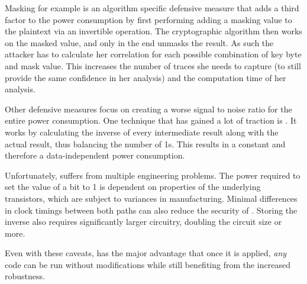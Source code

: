 Masking\cite{golic2002multiplicative}\cite{coron2000boolean} for example is an algorithm specific defensive measure that adds a third factor to the power consumption by first performing adding a masking value to the plaintext via an invertible operation.
The cryptographic algorithm then works on the masked value, and only in the end unmasks the result.
As such the attacker has to calculate her correlation for each possible combination of key byte and mask value.
This increases the number of traces she needs to capture (to still provide the same confidence in her analysis) and the computation time of her analysis.

Other defensive measures focus on creating a worse signal to noise ratio for the entire power consumption.
One technique that has gained a lot of traction is \dual{}\cite{sokolov2005design}.
It works by calculating the inverse of every intermediate result along with the actual result, thus balancing the number of 1s.
This results in a constant \hammingw{} and therefore a data-independent power consumption.

Unfortunately, \dual{} suffers from multiple engineering problems.
The power required to set the value of a bit to 1 is dependent on properties of the underlying transistors, which are subject to variances in manufacturing.\cite{razafindraibe2006formal}
Minimal differences in clock timings between both paths can also reduce the security of \dual{}\cite{baddam2008path}.
Storing the inverse also requires significantly larger circuitry, doubling the circuit size or more\cite{baddam2008path}.

Even with these caveats, \dual{} has the major advantage that once it is applied, \emph{any} code can be run without modifications while still benefiting from the increased robustness.
